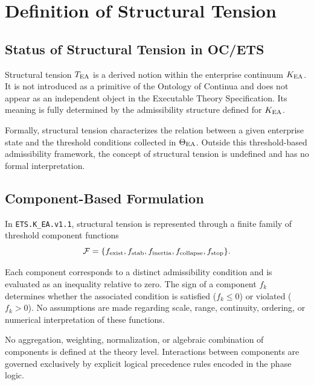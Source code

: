 ﻿%

\section{Definition of Structural Tension}

\subsection{Status of Structural Tension in OC/ETS}

Structural tension $T_{\mathrm{EA}}$ is a derived notion within the enterprise
continuum $K_{\mathrm{EA}}$. It is not introduced as a primitive of the Ontology of
Continua and does not appear as an independent object in the Executable
Theory Specification. Its meaning is fully determined by the
admissibility structure defined for $K_{\mathrm{EA}}$.

Formally, structural tension characterizes the relation between a given
enterprise state and the threshold conditions collected in $\Theta_{\mathrm{EA}}$.
Outside this threshold-based admissibility framework, the concept of
structural tension is undefined and has no formal interpretation.

\subsection{Component-Based Formulation}

In \texttt{ETS.K\_EA.v1.1}, structural tension is represented through a
finite family of threshold component functions
\[
\mathcal{F} =
\{f_{\text{exist}},f_{\text{stab}},f_{\text{inertia}},f_{\text{collapse}},f_{\text{stop}}\}.
\]

Each component corresponds to a distinct admissibility condition and is
evaluated as an inequality relative to zero. The sign of a component
$f_k$ determines whether the associated condition is satisfied
($f_k \leq 0$) or violated ($f_k > 0$). No assumptions are made regarding
scale, range, continuity, ordering, or numerical interpretation of these
functions.

No aggregation, weighting, normalization, or algebraic combination of
components is defined at the theory level. Interactions between
components are governed exclusively by explicit logical precedence rules
encoded in the phase logic.

